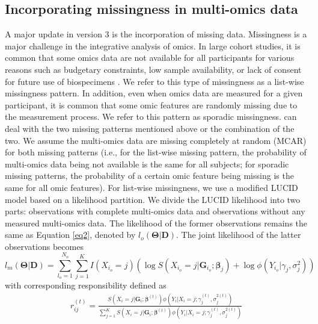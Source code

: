 \subsection{Incorporating missingness in multi-omics data}
A major update in  version 3 is the incorporation of missing data. Missingness is a major challenge in the integrative analysis of omics. In large cohort studies, it is common that some omics data are not available for all participants for various reasons such as budgetary constraints, low sample availability, or lack of consent for future use of biospecimens \citep{voillet2016handling}. We refer to this type of missingness as a list-wise missingness pattern. In addition, even when omics data are measured for a given participant, it is common that some omic features are randomly missing due to the measurement process. We refer to this pattern as sporadic missingness.  can deal with the two missing patterns mentioned above or the combination of the two. We assume the multi-omics data are missing completely at random (MCAR) for both missing patterns (i.e., for the list-wise missing pattern, the probability of multi-omics data being not available is the same for all subjects; for sporadic missing patterns, the probability of a certain omic feature being missing is the same for all omic features).
For list-wise missingness, we use a modified LUCID model based on a likelihood partition. We divide the LUCID likelihood into two parts: observations with complete multi-omics data and observations without any measured multi-omics data. The likelihood of the former observations remains the same as Equation \ref{eq2}, denoted by $l_o (\bm{\Theta}|\bm{D})$. The joint likelihood of the latter observations becomes
\begin{equation}
    l_m(\bm{\Theta}|\bm{D}) = \sum_{l_o=1}^{N_o}\sum_{j=1}^K I(X_{i_o} = j) \left( \log S(X_{i_o} = j| \bm{G}_{i_o};\bm{\beta}_j) + \log \phi\left(Y_{i_o}|\gamma_j, \sigma_j^2\right)\right)
    \label{eq22}
\end{equation}
with corresponding responsibility defined as
\begin{equation}
    \begin{aligned}
        r_{ij}^{(t)} = \frac{S\left(X_i = j| \bm{G}_i; \bm{\beta}^{(t)}\right) \phi\left(Y_i|X_i = j; \gamma_j^{(t)}, \sigma^{2(t)}_j \right)}{\sum_{j = 1}^K S\left(X_i = j| \bm{G}_i; \bm{\beta}^{(t)}\right) \phi \left(Y_i|X_i = j; \gamma_j^{(t)}, \sigma^{2(t)}_j\right)}
    \end{aligned}
    \label{eq23}
\end{equation}
